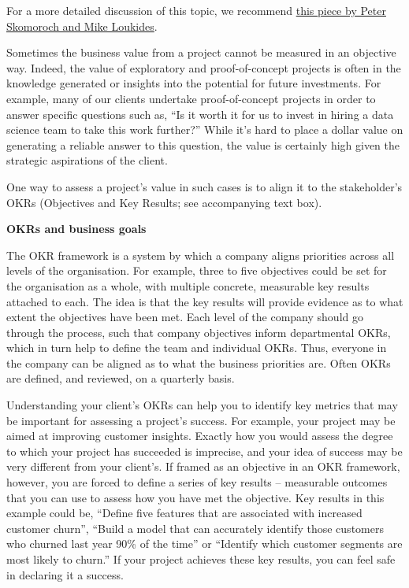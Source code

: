 \documentclass[
]{book}
\begin{document}
For a more detailed discussion of this topic, we recommend \href{https://www.oreilly.com/radar/what-you-need-to-know-about-product-management-for-ai/}{this piece by Peter Skomoroch and Mike Loukides}.

Sometimes the business value from a project cannot be measured in an objective way. Indeed, the value of exploratory and proof-of-concept projects is often in the knowledge generated or insights into the potential for future investments. For example, many of our clients undertake proof-of-concept projects in order to answer specific questions such as, ``Is it worth it for us to invest in hiring a data science team to take this work further?'' While it's hard to place a dollar value on generating a reliable answer to this question, the value is certainly high given the strategic aspirations of the client.

One way to assess a project's value in such cases is to align it to the stakeholder's OKRs (Objectives and Key Results; see accompanying text box).

\begin{infobox}

\textbf{OKRs and business goals}

The OKR framework is a system by which a company aligns priorities across all levels of the organisation. For example, three to five objectives could be set for the organisation as a whole, with multiple concrete, measurable key results attached to each. The idea is that the key results will provide evidence as to what extent the objectives have been met. Each level of the company should go through the process, such that company objectives inform departmental OKRs, which in turn help to define the team and individual OKRs. Thus, everyone in the company can be aligned as to what the business priorities are. Often OKRs are defined, and reviewed, on a quarterly basis.

\end{infobox}

Understanding your client's OKRs can help you to identify key metrics that may be important for assessing a project's success. For example, your project may be aimed at improving customer insights. Exactly how you would assess the degree to which your project has succeeded is imprecise, and your idea of success may be very different from your client's. If framed as an objective in an OKR framework, however, you are forced to define a series of key results -- measurable outcomes that you can use to assess how you have met the objective. Key results in this example could be, ``Define five features that are associated with increased customer churn'', ``Build a model that can accurately identify those customers who churned last year 90\% of the time'' or ``Identify which customer segments are most likely to churn.'' If your project achieves these key results, you can feel safe in declaring it a success.
\end{document}
